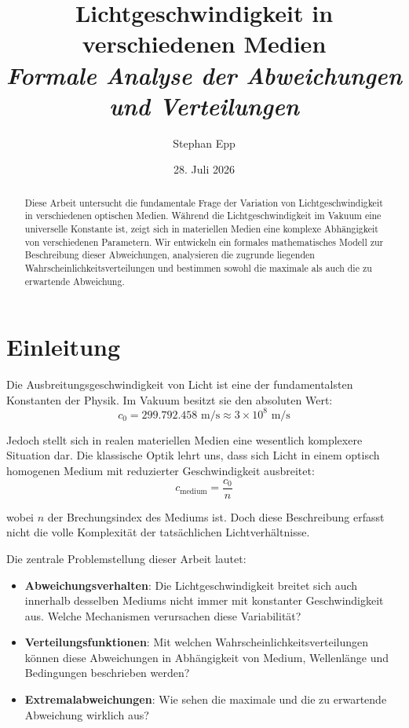 \documentclass[a4paper,12pt]{article}
\title{\Large \textbf{Lichtgeschwindigkeit in verschiedenen Medien}\\
\textit{Formale Analyse der Abweichungen und Verteilungen}}
\author{Stephan Epp}
\date{28. Juli 2026}
\theoremstyle{definition}
\theoremstyle{remark}
\newcommand{\cLight}{c}
\newcommand{\refIndex}{n}
\begin{document}
\maketitle
\thispagestyle{empty}

\begin{abstract}
Diese Arbeit untersucht die fundamentale Frage der Variation von Lichtgeschwindigkeit in verschiedenen optischen Medien. Während die Lichtgeschwindigkeit im Vakuum eine universelle Konstante ist, zeigt sich in materiellen Medien eine komplexe Abhängigkeit von verschiedenen Parametern. Wir entwickeln ein formales mathematisches Modell zur Beschreibung dieser Abweichungen, analysieren die zugrunde liegenden Wahrscheinlichkeitsverteilungen und bestimmen sowohl die maximale als auch die zu erwartende Abweichung.
\end{abstract}

\tableofcontents
\newpage

\section{Einleitung}
Die Ausbreitungsgeschwindigkeit von Licht ist eine der fundamentalsten Konstanten der Physik. Im Vakuum besitzt sie den absoluten Wert:
\begin{equation}
    \cLight_0 = 299.792.458 \text{ m/s} \approx 3 \times 10^8 \text{ m/s}
\end{equation}

Jedoch stellt sich in realen materiellen Medien eine wesentlich komplexere Situation dar. Die klassische Optik lehrt uns, dass sich Licht in einem optisch homogenen Medium mit reduzierter Geschwindigkeit ausbreitet:
\begin{equation}
    \cLight_{\text{medium}} = \frac{\cLight_0}{\refIndex}
\end{equation}

wobei $\refIndex$ der Brechungsindex des Mediums ist. Doch diese Beschreibung erfasst nicht die volle Komplexität der tatsächlichen Lichtverhältnisse.

Die zentrale Problemstellung dieser Arbeit lautet:
\begin{itemize}
    \item \textbf{Abweichungsverhalten}: Die Lichtgeschwindigkeit breitet sich auch innerhalb desselben Mediums nicht immer mit konstanter Geschwindigkeit aus. Welche Mechanismen verursachen diese Variabilität?
    \item \textbf{Verteilungsfunktionen}: Mit welchen Wahrscheinlichkeitsverteilungen können diese Abweichungen in Abhängigkeit von Medium, Wellenlänge und Bedingungen beschrieben werden?
    \item \textbf{Extremalabweichungen}: Wie sehen die maximale und die zu erwartende Abweichung wirklich aus?
\end{itemize}
\end{document}
